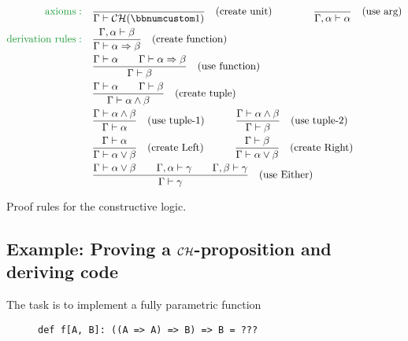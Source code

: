 \begin{table}
{\small{}
\begin{align*}
{\color{greenunder}\text{axioms}:}\quad & \frac{~}{\Gamma\vdash{\cal CH}(\bbnum 1)}\quad(\text{create unit})\quad\quad\quad\quad\frac{~}{\Gamma,\alpha\vdash\alpha}\quad(\text{use arg})\\
{\color{greenunder}\text{derivation rules}:}\quad & \frac{\Gamma,\alpha\vdash\beta}{\Gamma\vdash\alpha\Rightarrow\beta}\quad(\text{create function})\\
 & \frac{\Gamma\vdash\alpha\quad\quad\Gamma\vdash\alpha\Rightarrow\beta}{\Gamma\vdash\beta}\quad(\text{use function})\\
 & \frac{\Gamma\vdash\alpha\quad\quad\Gamma\vdash\beta}{\Gamma\vdash\alpha\wedge\beta}\quad(\text{create tuple})\\
 & \frac{\Gamma\vdash\alpha\wedge\beta}{\Gamma\vdash\alpha}\quad(\text{use tuple-}1)\quad\quad\quad\frac{\Gamma\vdash\alpha\wedge\beta}{\Gamma\vdash\beta}\quad(\text{use tuple-}2)\\
 & \frac{\Gamma\vdash\alpha}{\Gamma\vdash\alpha\vee\beta}\quad(\text{create Left})\quad\quad\quad\frac{\Gamma\vdash\beta}{\Gamma\vdash\alpha\vee\beta}\quad(\text{create Right})\\
 & \frac{\Gamma\vdash\alpha\vee\beta\quad\quad\Gamma,\alpha\vdash\gamma\quad\quad\Gamma,\beta\vdash\gamma}{\Gamma\vdash\gamma}\quad(\text{use Either})
\end{align*}
}{\small\par}

\caption{Proof rules for the constructive logic.\label{tab:Proof-rules-for-constructive-logic}}
\end{table}


\subsection{Example: Proving a ${\cal CH}$-proposition and deriving code\label{subsec:Example:-Proving-a-ch-proposition}}

The task is to implement a fully parametric function

\begin{wrapfigure}{l}{0.45\columnwidth}%
\vspace{-0.75\baselineskip}
\begin{lstlisting}
def f[A, B]: ((A => A) => B) => B = ???
\end{lstlisting}

\vspace{-0.9\baselineskip}
\end{wrapfigure}%

